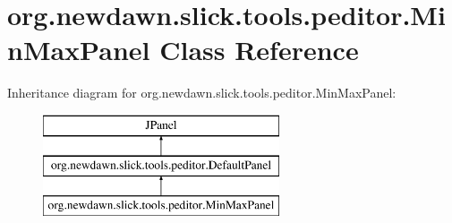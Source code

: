 \hypertarget{classorg_1_1newdawn_1_1slick_1_1tools_1_1peditor_1_1_min_max_panel}{}\section{org.\+newdawn.\+slick.\+tools.\+peditor.\+Min\+Max\+Panel Class Reference}
\label{classorg_1_1newdawn_1_1slick_1_1tools_1_1peditor_1_1_min_max_panel}
Inheritance diagram for org.\+newdawn.\+slick.\+tools.\+peditor.\+Min\+Max\+Panel\+:\begin{figure}[H]
\begin{center}
\leavevmode
\includegraphics[height=3.000000cm]{classorg_1_1newdawn_1_1slick_1_1tools_1_1peditor_1_1_min_max_panel}
\end{center}
\end{figure}
